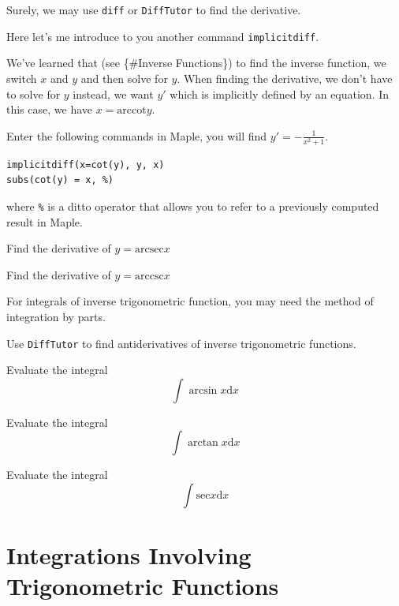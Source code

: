 \documentclass[]{book}
\theoremstyle{definition}
\theoremstyle{definition}
\theoremstyle{definition}
\theoremstyle{remark}
\let\BeginKnitrBlock\begin \let\EndKnitrBlock\end
\begin{document}
\BeginKnitrBlock{solution}
{}

Surely, we may use \texttt{diff} or \texttt{DiffTutor} to find the derivative.

Here let's me introduce to you another command \texttt{implicitdiff}.

We've learned that (see \{\#Inverse Functions\}) to find the inverse function, we switch \(x\) and \(y\) and then solve for \(y\). When finding the derivative, we don't have to solve for \(y\) instead, we want \(y'\) which is implicitly defined by an equation. In this case, we have \(x=\mathrm{arccot}y\).

Enter the following commands in Maple, you will find \(y'=-\frac{1}{x^2+1}\).

\begin{verbatim}
implicitdiff(x=cot(y), y, x)
subs(cot(y) = x, %)
\end{verbatim}

where \texttt{\%} is a ditto operator that allows you to refer to a previously computed result in Maple.
\EndKnitrBlock{solution}

\BeginKnitrBlock{exercise}
\protect\hypertarget{exr:unnamed-chunk-6}{}{\label{exr:unnamed-chunk-6} }
Find the derivative of \(y=\mathrm{arcsec} x\)
\EndKnitrBlock{exercise}

\BeginKnitrBlock{exercise}
\protect\hypertarget{exr:unnamed-chunk-7}{}{\label{exr:unnamed-chunk-7} }
Find the derivative of \(y=\mathrm{arccsc} x\)
\EndKnitrBlock{exercise}

For integrals of inverse trigonometric function, you may need the method of integration by parts.

Use \texttt{DiffTutor} to find antiderivatives of inverse trigonometric functions.

\BeginKnitrBlock{exercise}
\protect\hypertarget{exr:unnamed-chunk-8}{}{\label{exr:unnamed-chunk-8} }
Evaluate the integral
\[
\int \arcsin x \mathrm{d} x
\]
\EndKnitrBlock{exercise}

\BeginKnitrBlock{exercise}
\protect\hypertarget{exr:unnamed-chunk-9}{}{\label{exr:unnamed-chunk-9} }
Evaluate the integral
\[
\int \arctan x \mathrm{d} x
\]
\EndKnitrBlock{exercise}

\BeginKnitrBlock{exercise}
\protect\hypertarget{exr:unnamed-chunk-10}{}{\label{exr:unnamed-chunk-10} }
Evaluate the integral
\[
\int \mathrm{sec} x \mathrm{d} x
\]
\EndKnitrBlock{exercise}

\hypertarget{integrations-involving-trigonometric-functions}{%
\chapter{Integrations Involving Trigonometric Functions}\label{integrations-involving-trigonometric-functions}}
\end{document}
